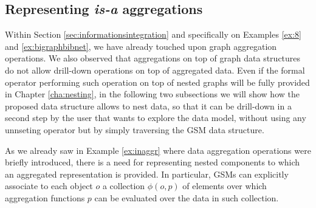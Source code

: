 \subsection{Representing \textit{is-a} aggregations}\label{subsec:representingisa}

Within Section \vref{sec:informationsintegration} and specifically on Examples \ref{ex:8} and \ref{ex:bigraphbibnet}, we have already touched upon graph aggregation operations. We also observed that aggregations on top of graph data structures do not allow drill-down operations on top of aggregated data. Even if the formal operator performing such operation on top of nested graphs will be fully provided in Chapter \vref{cha:nesting}, in the following two subsections we will show how the proposed data structure allows to nest data, so that it can be drill-down in a second step by the user that wants to explore the data model, without using any unnseting operator but by simply traversing the GSM data structure.

As we already saw in Example \vref{ex:inaggr} where data aggregation operations were briefly introduced, there is a need for representing nested components to which an aggregated representation is provided. In particular, GSMs can explicitly associate to each object $o$ a collection $\phi(o,p)$ of elements over which aggregation functions $p$ can be evaluated over the data in such collection.

